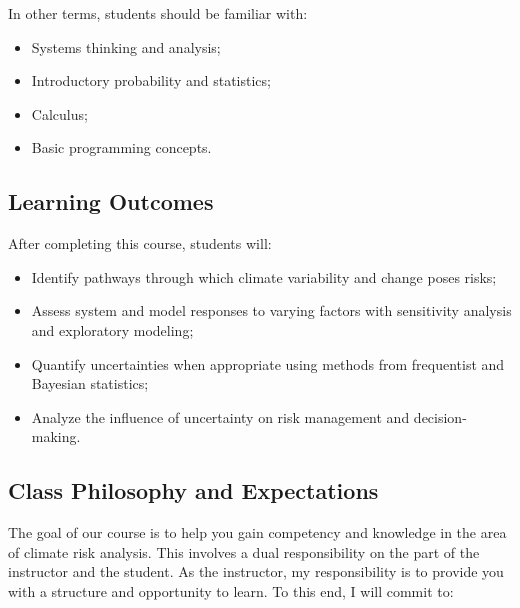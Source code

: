 \documentclass[12pt,a4paper]{article}
\begin{document}
In other terms, students should be familiar with:

\begin{itemize}
\item Systems thinking and analysis;


\item Introductory probability and statistics;


\item Calculus;


\item Basic programming concepts.

\end{itemize}
\subsection{Learning Outcomes}
After completing this course, students will:

\begin{itemize}
\item Identify pathways through which climate variability and change poses risks;


\item Assess system and model responses to varying factors with sensitivity analysis and exploratory modeling;


\item Quantify uncertainties when appropriate using methods from frequentist and Bayesian statistics;


\item Analyze the influence of uncertainty on risk management and decision-making.

\end{itemize}
\subsection{Class Philosophy and Expectations}
The goal of our course is to help you gain competency and knowledge in the area of climate risk analysis. This involves a dual responsibility on the part of the instructor and the student. As the instructor, my responsibility is to provide you with a structure and opportunity to learn. To this end, I will commit to:
\end{document}
